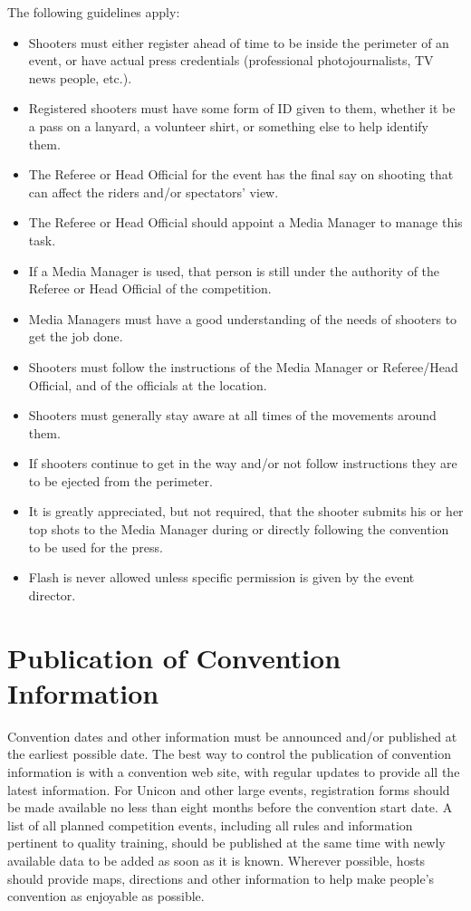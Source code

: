 The following guidelines apply:
\begin{itemize}
\item Shooters must either register ahead of time to be inside the perimeter of an event, or have actual press credentials (professional photojournalists, TV news people, etc.).
\item Registered shooters must have some form of ID given to them, whether it be a pass on a lanyard, a volunteer shirt, or something else to help identify them.
\item The Referee or Head Official for the event has the final say on shooting that can affect the riders and/or spectators’ view.
\item The Referee or Head Official should appoint a Media Manager to manage this task.
\item If a Media Manager is used, that person is still under the authority of the Referee or Head Official of the competition.
\item Media Managers must have a good understanding of the needs of shooters to get the job done.
\item Shooters must follow the instructions of the Media Manager or Referee/Head Official, and of the officials at the location.
\item Shooters must generally stay aware at all times of the movements around them.
\item If shooters continue to get in the way and/or not follow instructions they are to be ejected from the perimeter.
\item It is greatly appreciated, but not required, that the shooter submits his or her top shots to the Media Manager during or directly following the convention to be used for the press.
\item Flash is never allowed unless specific permission is given by the event director.
\end{itemize}

\section{Publication of Convention Information}

Convention dates and other information must be announced and/or published at the earliest possible date. 
The best way to control the publication of convention information is with a convention web site, with regular updates to provide all the latest information. 
For Unicon and other large events, registration forms should be made available no less than eight months before the convention start date. 
A list of all planned competition events, including all rules and information pertinent to quality training, should be published at the same time with newly available data to be added as soon as it is known. 
Wherever possible, hosts should provide maps, directions and other information to help make people's convention as enjoyable as possible.

